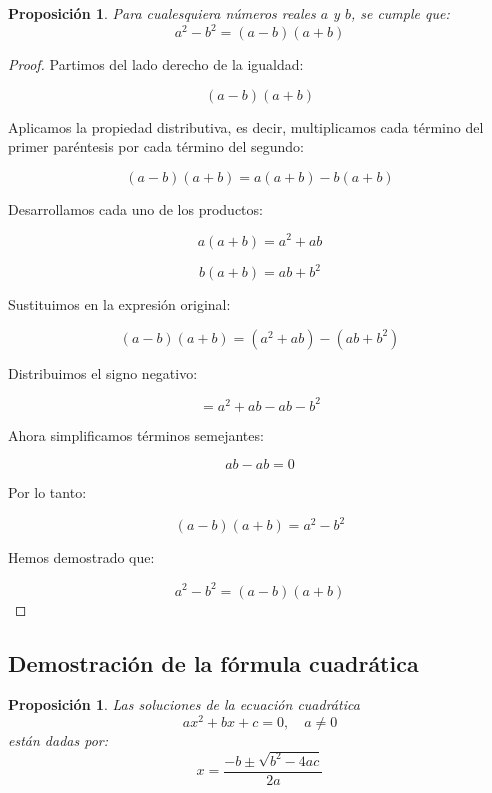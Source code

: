 \documentclass[12pt,final]{report}
\theoremstyle{plain}
\newtheorem{proposition}[theorem]{Proposición}
\theoremstyle{definition}
\begin{document}
\begin{proposition}
Para cualesquiera números reales $a$ y $b$, se cumple que:
\[
a^2 - b^2 = (a-b)(a+b)
\]
\end{proposition}

\begin{proof}

Partimos del lado derecho de la igualdad:

\[
(a-b)(a+b)
\]

Aplicamos la propiedad distributiva, es decir, multiplicamos cada término del primer paréntesis por cada término del segundo:

\[
(a-b)(a+b) = a(a+b) - b(a+b)
\]

Desarrollamos cada uno de los productos:

\[
a(a+b) = a^2 + ab
\]

\[
b(a+b) = ab + b^2
\]

Sustituimos en la expresión original:

\[
(a-b)(a+b) = (a^2 + ab) - (ab + b^2)
\]

Distribuimos el signo negativo:

\[
= a^2 + ab - ab - b^2
\]

Ahora simplificamos términos semejantes:

\[
ab - ab = 0
\]

Por lo tanto:

\[
(a-b)(a+b) = a^2 - b^2
\]

Hemos demostrado que:

\[
a^2 - b^2 = (a-b)(a+b)
\]

\end{proof}

\newpage

\subsection{Demostración de la fórmula cuadrática}

\begin{proposition}
Las soluciones de la ecuación cuadrática
\[
ax^2 + bx + c = 0, \quad a \neq 0
\]
están dadas por:
\[
x = \frac{-b \pm \sqrt{b^2 - 4ac}}{2a}
\]
\end{proposition}
\end{document}
